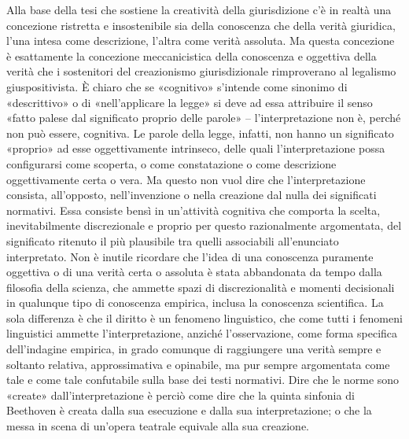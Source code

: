 Alla base della tesi che sostiene la creatività della giurisdizione c’è in realtà una concezione ristretta e insostenibile sia della conoscenza che della verità giuridica, l’una intesa come descrizione, l’altra come verità assoluta. Ma questa concezione è esattamente la concezione meccanicistica della conoscenza e oggettiva della verità che i sostenitori del creazionismo giurisdizionale rimproverano al legalismo giuspositivista. È chiaro che se «cognitivo» s’intende come sinonimo di «descrittivo» o di «nell’applicare la legge» si deve ad essa attribuire il senso «fatto palese dal significato proprio delle parole» – l’interpretazione non è, perché non può essere, cognitiva. Le parole della legge, infatti, non hanno un significato «proprio» ad esse oggettivamente intrinseco, delle quali l’interpretazione possa configurarsi come scoperta, o come constatazione o come descrizione oggettivamente certa o vera. Ma questo non vuol dire che l’interpretazione consista, all’opposto, nell’invenzione o nella creazione dal nulla dei significati normativi. 
Essa consiste bensì in un’attività cognitiva che comporta la scelta, inevitabilmente discrezionale e proprio per questo razionalmente argomentata, del significato ritenuto il più plausibile tra quelli associabili all’enunciato interpretato. Non è inutile ricordare che l’idea di una conoscenza puramente oggettiva o di una verità certa o assoluta è stata abbandonata da tempo dalla filosofia della scienza, che ammette spazi di discrezionalità e momenti decisionali in qualunque tipo di conoscenza empirica, inclusa la conoscenza scientifica. La sola differenza è che il diritto è un fenomeno linguistico, che come tutti i fenomeni linguistici ammette l’interpretazione, anziché l’osservazione, come forma specifica dell’indagine empirica, in grado comunque di raggiungere una verità sempre e soltanto relativa, approssimativa e opinabile, ma pur sempre argomentata come tale e come tale confutabile sulla base dei testi normativi. Dire che le norme sono «create» dall’interpretazione è perciò come dire che la quinta sinfonia di Beethoven è creata dalla sua esecuzione e dalla sua interpretazione; o che la messa in scena di un’opera teatrale equivale alla sua creazione.
